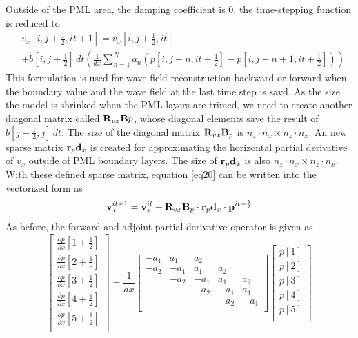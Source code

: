 \documentclass[revised,endfloat]{geophysics}
\begin{document}
Outside of the PML area, the damping coefficient is $0$, the time-stepping function is reduced to
\begin{equation}
\begin{split}
& v_x[i,j+\frac{1}{2},it+1] = v_x[i,j+\frac{1}{2},it] \\
& + b[i,j+\frac{1}{2}] \, dt \left( \frac{1}{dx} \sum_{n=1}^N  a_n \left( p[i,j+n,it+\frac{1}{2}] - p[i,j-n+1,it+\frac{1}{2}]\right) \right)
\end{split}
\label{eq20}
\end{equation}
This formulation is used for wave field reconstruction backward or forward when the boundary value and the wave field at the last time step is savd. As the size the model is shrinked when the PML layers are trimed, we need to create another diagonal matrix called ${\bf R}_{vx}{\bf B}p$, whose diagonal elements save the result of $b[j+\frac{1}{2},j] \, dt$. The size of the diagonal matrix ${\bf R}_{vx}{\bf B}_p$ is $n_z \cdot n_x \times n_z \cdot n_x$. An new sparse matrix ${\bf r}_p{\bf d}_x$ is created for approximating the horizontal partial derivative of $v_x$ outside of PML boundary layers. The size of  ${\bf r}_p{\bf d}_x$ is also $n_z \cdot n_x \times n_z \cdot n_x$. With these defined sparse matrix, equation \ref{eq20} can be written into the vectorized form as 
\begin{equation}
{\bf v}_x^{it+1} =  {\bf v}_x^{it} +  {\bf R}_{vx}{\bf B}_{p} \cdot {\bf r}_p{\bf d}_x \cdot {\bf p}^{it+\frac{1}{2}} 
\label{eq21}
\end{equation}
As before, the forward and adjoint partial derivative operator is given as
\begin{equation}
\begin{bmatrix}
\frac{\partial p}{\partial x}[1+\frac{1}{2}] \\
\frac{\partial p}{\partial x}[2+\frac{1}{2}] \\
\frac{\partial p}{\partial x}[3+\frac{1}{2}] \\
\frac{\partial p}{\partial x}[4+\frac{1}{2}] \\
\frac{\partial p}{\partial x}[5+\frac{1}{2}] \\
\end{bmatrix}
= \frac{1}{dx} \begin{bmatrix}
-a_1 & a_1 & a_2 & & \\
-a_2 & -a_1 & a_1 & a_2 & \\
& -a_2 & -a_1 & a_1 & a_2 \\
& & -a_2 & -a_1 & a_1 \\
& & & -a_2 & -a_1 \\
\end{bmatrix}
\begin{bmatrix}
p[1] \\
p[2] \\
p[3] \\
p[4] \\
p[5] \\
\end{bmatrix}
\label{eq22}
\end{equation}
\end{document}
